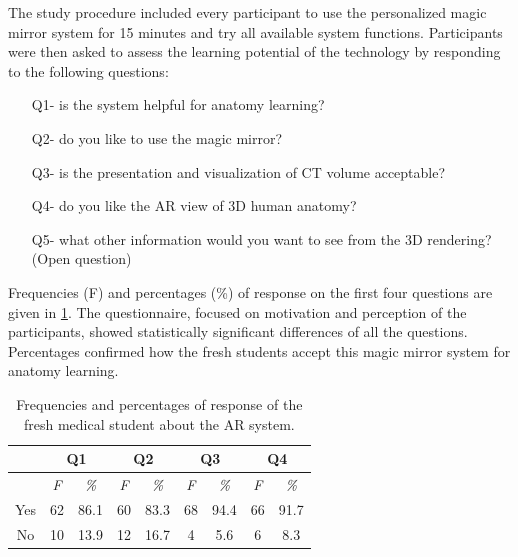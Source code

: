 {{{{{The study procedure included every participant to use the personalized magic mirror system for 15 minutes and try all available system functions. Participants were then asked to assess the learning potential of the technology by responding to the following questions:
\begin{itemize}
	\item[Q1-] is the system helpful for anatomy learning?  
	\item[Q2-] do you like to use the magic mirror? 
	\item[Q3-] is the presentation and visualization of CT volume acceptable? 
	\item[Q4-] do you like the AR view of 3D human anatomy? 
	\item[Q5-] what other information would you want to see from the 3D rendering? (Open question)
\end{itemize}
Frequencies (F) and percentages (\%) of response on the first four questions are given in \tablename{\ref{tb:3-MMC:userStudy}}. The questionnaire, focused on motivation and perception of the participants, showed statistically significant differences of all the questions. Percentages confirmed how the fresh students accept this magic mirror system for anatomy learning.
\begin{table}
	\caption[User study with fresh medical students]{Frequencies and percentages of response of the fresh medical student about the AR system.}
	\centering
	\label{tb:3-MMC:userStudy}
	\scriptsize
	\begin{center}
		\begin{tabular}{ccccccccc}
			\multicolumn{1}{c}{\space} & \multicolumn{2}{c}{\textbf{Q1}} & \multicolumn{2}{c}{\textbf{Q2}} & \multicolumn{2}{c}{\textbf{Q3}} & \multicolumn{2}{c}{\textbf{Q4}} \\
			\hline
			\space & \textit{F} &\textit{\%}& \textit{F} &\textit{\%}& \textit{F} &\textit{\%}& \textit{F} &\textit{\%} \\
			Yes & 62 & 86.1 & 60 & 83.3 & 68 & 94.4 & 66 & 91.7 \\
			No & 10 & 13.9 & 12 & 16.7 & 4 & 5.6 & 6 & 8.3 \\
			\hline
		\end{tabular}
	\end{center}
\end{table}

}}}}}
